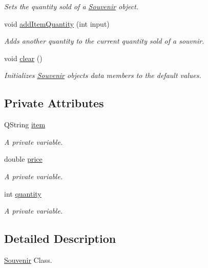 \begin{DoxyCompactItemize}
\begin{DoxyCompactList}\small\item\em Sets the quantity sold of a \hyperlink{class_souvenir}{Souvenir} object. \end{DoxyCompactList}\item 
void \hyperlink{class_souvenir_a512226cdc77f82549e31ae24f79816c7}{add\+Item\+Quantity} (int input)
\begin{DoxyCompactList}\small\item\em Adds another quantity to the current quantity sold of a souvnir. \end{DoxyCompactList}\item 
void \hyperlink{class_souvenir_a828048672b2fe97e676333aedf67f2a4}{clear} ()
\begin{DoxyCompactList}\small\item\em Initializes \hyperlink{class_souvenir}{Souvenir} object\textquotesingle{}s data members to the default values. \end{DoxyCompactList}\end{DoxyCompactItemize}
\subsection*{Private Attributes}
\begin{DoxyCompactItemize}
\item 
Q\+String \hyperlink{class_souvenir_a2b4d7fa7359c623bad007f875de71131}{item}
\begin{DoxyCompactList}\small\item\em A private variable. \end{DoxyCompactList}\item 
double \hyperlink{class_souvenir_a2991e814ee69fba3a86d90b7ea48cb2b}{price}
\begin{DoxyCompactList}\small\item\em A private variable. \end{DoxyCompactList}\item 
int \hyperlink{class_souvenir_a0cf32206e9891435fa2bf609183f8412}{quantity}
\begin{DoxyCompactList}\small\item\em A private variable. \end{DoxyCompactList}\end{DoxyCompactItemize}


\subsection{Detailed Description}
\hyperlink{class_souvenir}{Souvenir} Class. 

